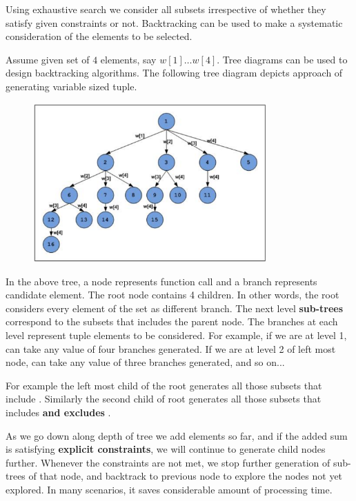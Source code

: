 
Using exhaustive search we consider all subsets irrespective of whether they
satisfy given constraints or not. Backtracking can be used to make a
systematic consideration of the elements to be selected.


Assume given set of $4$ elements, say $w[1]\ldots w[4]$. Tree diagrams can
be used to design backtracking algorithms. The following tree diagram
depicts approach of generating variable sized tuple.

\begin{figure}
\centering
\includegraphics[width=0.8\textwidth]{Images/figGFGBkTSet4SubsetSum}
\end{figure}

In the above tree, a node represents function call and a branch represents
candidate element. The root node contains 4 children. In other words, the
root considers every element of the set as different branch. The next level
\textbf{sub-trees} correspond to the subsets that includes the parent node.
The branches at each level represent tuple elements to be considered. For
example, if we are at level 1,  can take any value of
four branches generated. If we are at level 2 of left most node,
 can take any value of three branches generated, and
so on...

For example the left most child of the root generates all those subsets that
include . Similarly the second child of root generates all those
subsets that includes  \textbf{and excludes} .

As we go down along depth of tree we add elements so far, and if the added
sum is satisfying \textbf{explicit constraints}, we will continue to
generate child nodes further. Whenever the constraints are not met, we stop
further generation of sub-trees of that node, and backtrack to previous node
to explore the nodes not yet explored. In many scenarios, it saves
considerable amount of processing time.

